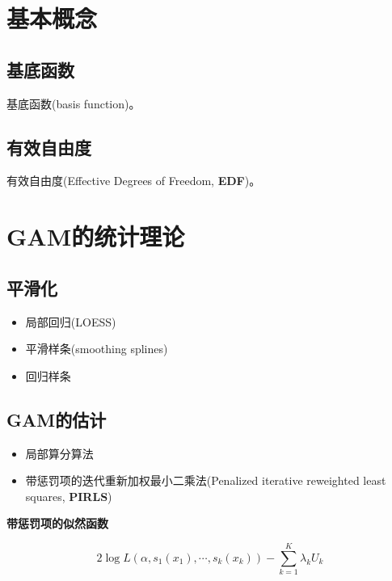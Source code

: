 \documentclass[]{ctexart}
\providecommand{\tightlist}{%
  \setlength{\itemsep}{0pt}\setlength{\parskip}{0pt}}
\begin{document}
\hypertarget{section-1}{%
\section{基本概念}\label{section-1}}

\hypertarget{section-2}{%
\subsection{基底函数}\label{section-2}}

基底函数(basis function)。

\hypertarget{section-3}{%
\subsection{有效自由度}\label{section-3}}

有效自由度(Effective Degrees of Freedom, \textbf{EDF})。

\hypertarget{gam-3}{%
\section{GAM的统计理论}\label{gam-3}}

\hypertarget{section-4}{%
\subsection{平滑化}\label{section-4}}

\begin{itemize}
\tightlist
\item
  局部回归(LOESS)
\item
  平滑样条(smoothing splines)
\item
  回归样条
\end{itemize}

\hypertarget{gam-4}{%
\subsection{GAM的估计}\label{gam-4}}

\begin{itemize}
\tightlist
\item
  局部算分算法
\item
  带惩罚项的迭代重新加权最小二乘法(Penalized iterative reweighted least
  squares, \textbf{PIRLS})
\end{itemize}

\textbf{带惩罚项的似然函数}

\[2\log L(\alpha, s_1(x_1), \cdots, s_k(x_k)) - \sum_{k=1}^K\lambda_kU_k\]
\end{document}
